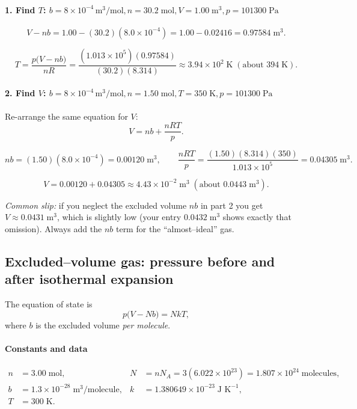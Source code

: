 \documentclass[12pt]{article}
\theoremstyle{definition} %
\theoremstyle{plain} %
\begin{document}
\paragraph{1.  Find \(T\): \(b=8\times10^{-4}\,\text{m}^{3}\!/\text{mol},
                           n=30.2\;\text{mol},
                           V=1.00\;\text{m}^{3},
                           p=101300\;\text{Pa}\)}

\[
  V-nb
  = 1.00 - (30.2)(8.0\times10^{-4})
  = 1.00 - 0.02416
  = 0.97584\;\text{m}^{3}.
\]

\[
  T
  = \frac{p\bigl(V-nb\bigr)}{nR}
  = \frac{(1.013\times10^{5})(0.97584)}
         {(30.2)(8.314)}
  \approx \boxed{3.94\times10^{2}\;\text{K}}
  \;(\text{about }394\;\text{K}).
\]

\paragraph{2.  Find \(V\): \(b=8\times10^{-4}\,\text{m}^{3}\!/\text{mol},
                           n=1.50\;\text{mol},
                           T=350\;\text{K},
                           p=101300\;\text{Pa}\)}

Re-arrange the same equation for \(V\):
\[
  V = nb + \frac{nRT}{p}.
\]

\[
  nb = (1.50)(8.0\times10^{-4}) = 0.00120\;\text{m}^{3},
  \qquad
  \frac{nRT}{p}
  = \frac{(1.50)(8.314)(350)}{1.013\times10^{5}}
  = 0.04305\;\text{m}^{3}.
\]

\[
  V
  = 0.00120 + 0.04305
  \approx \boxed{4.43\times10^{-2}\;\text{m}^{3}}
  \;(\text{about }0.0443\;\text{m}^{3}).
\]

\medskip
\textit{Common slip:} if you neglect the excluded volume \(nb\) in part 2 you
get \(V \approx 0.0431\;\text{m}^{3}\), which is slightly low (your entry
\(0.0432\;\text{m}^{3}\) shows exactly that omission).  Always add the \(nb\)
term for the “almost–ideal” gas.
\subsection*{Excluded–volume gas: pressure before and after isothermal expansion}

The equation of state is
\[
  p\bigl(V - Nb\bigr) = NkT,
\]
where \(b\) is the excluded volume \emph{per molecule}.

\paragraph{Constants and data}
\[
  \begin{aligned}
    n &= 3.00\;\text{mol},
    &
    N &= nN_A = 3(6.022\times10^{23}) = 1.807\times10^{24}\;\text{molecules}, \\[4pt]
    b &= 1.3\times10^{-28}\;\text{m}^{3}\!/\text{molecule},
    &
    k &= 1.380649\times10^{-23}\;\text{J K}^{-1}, \\[4pt]
    T &= 300\;\text{K}.
  \end{aligned}
\]
\end{document}
